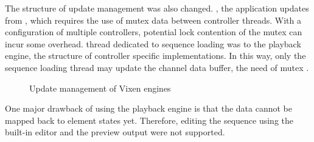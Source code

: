The structure of update management was also changed. , the application updates  from , which requires the use of mutex  data  between controller threads. With a configuration  of multiple controllers, potential lock contention of the mutex can incur some overhead.  thread dedicated to sequence loading was  to the playback engine,  the structure of controller specific implementations. In this way, only the sequence loading thread may update the channel data buffer,  the need of mutex . 

\begin{figure}[t]
  \centering
  \hfil
  \caption{\footnotesize Update management of Vixen engines}
  \label{fig:update}
\end{figure}

One major drawback of using the playback engine is that the  data cannot be mapped back to element states yet. Therefore, editing the  sequence using the built-in editor and the preview output were not supported.

